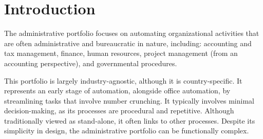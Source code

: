 \section{Introduction}

The administrative portfolio focuses on automating organizational activities that are often administrative and bureaucratic in nature, including: accounting and tax management, finance, human resources, project management (from an accounting perspective), and governmental procedures.

This portfolio is largely industry-agnostic, although it is country-specific. 
It represents an early stage of automation, alongside office automation, by streamlining tasks that involve number crunching. 
It typically involves minimal decision-making, as its processes are procedural and repetitive. 
Although traditionally viewed as stand-alone, it often links to other processes.
Despite its simplicity in design, the administrative portfolio can be functionally complex.